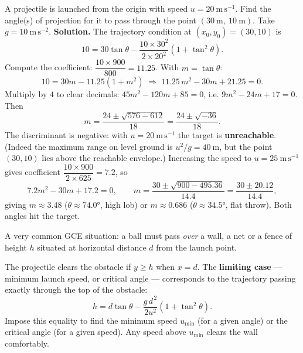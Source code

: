 \documentclass[11pt]{article}
\newcounter{popsec}
\newcounter{popsub}
\newcommand{\courssub}[1]{%
  \stepcounter{popsub}%
  \par\vspace{9pt}\noindent{\popxbold\fontsize{11.5}{13}\selectfont\color{popink}{\color{poporange}\thepopsec.\thepopsub}\hspace{6pt}#1}\par\nopagebreak\vspace{4pt}
}
\begin{document}
\begin{exoresolu}
A projectile is launched from the origin with speed $u = 20\ \mathrm{m\,s^{-1}}$. Find the angle(s) of projection for it to pass through the point $(30\ \mathrm{m},\ 10\ \mathrm{m})$. Take $g = 10\ \mathrm{m\,s^{-2}}$.
\tcblower
\textbf{Solution.} The trajectory condition at $(x_0,y_0) = (30,10)$ is
\[ 10 = 30\tan\theta - \frac{10 \times 30^2}{2 \times 20^2}\left(1+\tan^2\theta\right). \]
Compute the coefficient: $\dfrac{10 \times 900}{800} = 11.25$. With $m = \tan\theta$:
\[ 10 = 30m - 11.25(1+m^2) \;\Longrightarrow\; 11.25\,m^2 - 30m + 21.25 = 0. \]
Multiply by $4$ to clear decimals: $45m^2 - 120m + 85 = 0$, i.e. $9m^2 - 24m + 17 = 0$. Then
\[ m = \frac{24 \pm \sqrt{576 - 612}}{18} = \frac{24 \pm \sqrt{-36}}{18}. \]
The discriminant is negative: with $u = 20\ \mathrm{m\,s^{-1}}$ the target is \textbf{unreachable}. (Indeed the maximum range on level ground is $u^2/g = 40\ \mathrm{m}$, but the point $(30,10)$ lies above the reachable envelope.) Increasing the speed to $u = 25\ \mathrm{m\,s^{-1}}$ gives coefficient $\dfrac{10 \times 900}{2 \times 625} = 7.2$, so
\[ 7.2m^2 - 30m + 17.2 = 0, \qquad m = \frac{30 \pm \sqrt{900 - 495.36}}{14.4} = \frac{30 \pm 20.12}{14.4}, \]
giving $m \approx 3.48$ ($\theta \approx 74.0°$, high lob) or $m \approx 0.686$ ($\theta \approx 34.5°$, flat throw). Both angles hit the target.
\end{exoresolu}

\courssub{Clearing an Obstacle}

A very common GCE situation: a ball must pass \emph{over} a wall, a net or a fence of height $h$ situated at horizontal distance $d$ from the launch point.

\begin{methode}
The projectile clears the obstacle if $y \geq h$ when $x = d$. The \textbf{limiting case} — minimum launch speed, or critical angle — corresponds to the trajectory passing exactly through the top of the obstacle:
\[ h = d\tan\theta - \frac{g\,d^{\,2}}{2u^2}\left(1+\tan^2\theta\right). \]
Impose this equality to find the minimum speed $u_{\min}$ (for a given angle) or the critical angle (for a given speed). Any speed above $u_{\min}$ clears the wall comfortably.
\end{methode}
\end{document}
